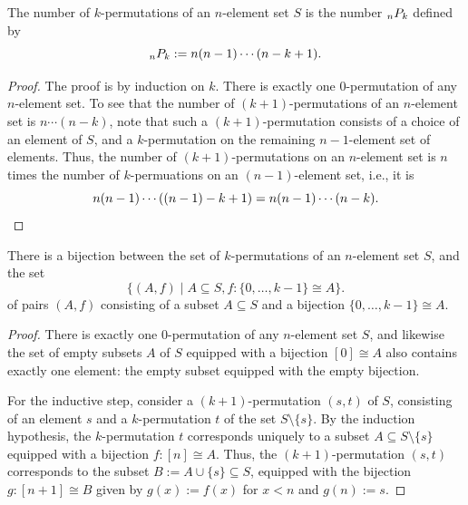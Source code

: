 \begin{lemma}
  The number of $k$-permutations of an $n$-element set $S$ is the number ${}_{n}P_{k}$ defined by
  \begin{equation*}
    {}_{n}P_{k} := n(n-1)\cdots(n-k+1).
  \end{equation*}
\end{lemma}

\begin{proof}
  The proof is by induction on $k$. There is exactly one $0$-permutation of any $n$-element set. To see that the number of $(k+1)$-permutations of an $n$-element set is $n\cdots(n-k)$, note that such a $(k+1)$-permutation consists of a choice of an element of $S$, and a $k$-permutation on the remaining $n-1$-element set of elements. Thus, the number of $(k+1)$-permutations on an $n$-element set is $n$ times the number of $k$-permuations on an $(n-1)$-element set, i.e., it is
  \begin{equation*}
    n(n-1)\cdots((n-1)-k+1)=n(n-1)\cdots(n-k).\qedhere
  \end{equation*}
\end{proof}

\begin{proposition}\label{proposition:characterize-k-permutations}
  There is a bijection between the set of $k$-permutations of an $n$-element set $S$, and the set
  \begin{equation*}
    \{(A,f) \mid A\subseteq S, f : \{0,\ldots,k-1\}\cong A\}.
  \end{equation*}
  of pairs $(A,f)$ consisting of a subset $A\subseteq S$ and a bijection $\{0,\ldots,k-1\}\cong A$.
\end{proposition}

\begin{proof}
  There is exactly one $0$-permutation of any $n$-element set $S$, and likewise the set of empty subsets $A$ of $S$ equipped with a bijection $[0]\cong A$ also contains exactly one element: the empty subset equipped with the empty bijection.

  For the inductive step, consider a $(k+1)$-permutation $(s,t)$ of $S$, consisting of an element $s$ and a $k$-permutation $t$ of the set $S\setminus\{s\}$. By the induction hypothesis, the $k$-permutation $t$ corresponds uniquely to a subset $A\subseteq S\setminus\{s\}$ equipped with a bijection $f:[n]\cong A$. Thus, the $(k+1)$-permutation $(s,t)$ corresponds to the subset $B:=A\cup\{s\}\subseteq S$, equipped with the bijection $g:[n+1]\cong B$ given by $g(x):=f(x)$ for $x<n$ and $g(n):= s$.
\end{proof}

